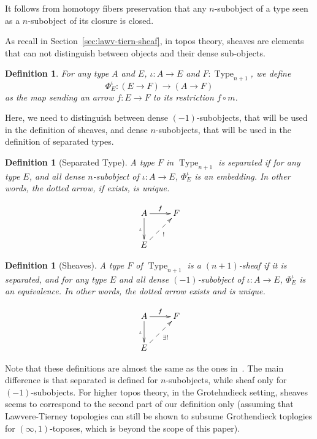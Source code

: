 \documentclass[conference]{IEEEtran}
\newtheorem{defi}[thm]{Definition}
\DeclareMathOperator{\Type}{Type}
\begin{document}
It follows from homotopy fibers preservation that any $n$-subobject of
a type seen as a $n$-subobject of its closure is closed.

As recall in Section~\ref{sec:lawv-tiern-sheaf}, in topos theory,
sheaves are elements that can not distinguish between objects and
their dense sub-objects. 

\begin{defi}
  For any type $A$ and $E$, $\iota : A \to E$ and $F:\Type_{n+1}$, we define
    $$
    \Phi_E^\iota : (E \to F) \to (A \to F) 
    $$
    as the map sending an
    arrow $f:E\to F$ to its restriction $f \circ m$.
\end{defi}

Here, we need to distinguish between
dense $(-1)$-subobjects, that will be used in the definition of
sheaves, and dense $n$-subobjects, that will be used in the definition
of separated types. 

\begin{defi}[Separated Type]
  A type $F$ in $\Type_{n+1}$ is {\em separated} if for any type $E$, and
  all dense $n$-subobject of $\iota : A \to E$,
  $\Phi_E^\iota$ is an embedding. In other words, the dotted arrow,
  if exists, is unique.

  $$\xymatrix{
    A \ar[r]^f \ar[d]_{\iota} & F \\
    E \ar@{-->}[ru]_{!}&
  }$$
\end{defi}

\begin{defi}[Sheaves]
  A type $F$ of $\Type_{n+1}$ is a {\em $(n+1)$-sheaf} if it is
  separated, and for any type $E$ and all dense $(-1)$-subobject of
  $\iota : A \to E$, $\Phi_E^\iota$ is an
  equivalence. In other words, the dotted arrow exists and is unique.

  $$\xymatrix{
    A \ar[r]^f \ar[d]_{\iota} & F \\
    E \ar@{-->}[ru]_{\exists !}&
  }$$
\end{defi}

Note that these definitions are almost the same as the ones
in~\cite{maclanemoerdijk}. The main difference is that {separated}
is defined for $n$-subobjects, while {sheaf} only for
$(-1)$-subobjects.
%
For higher topos theory, in the Grotehndieck setting, sheaves seems
to correspond to the second part of our definition only (assuming that
Lawvere-Tierney topologies can still be shown to subsume Grothendieck
toplogies for $(\infty,1)$-toposes, which is beyond the scope of this paper).
%
\end{document}
